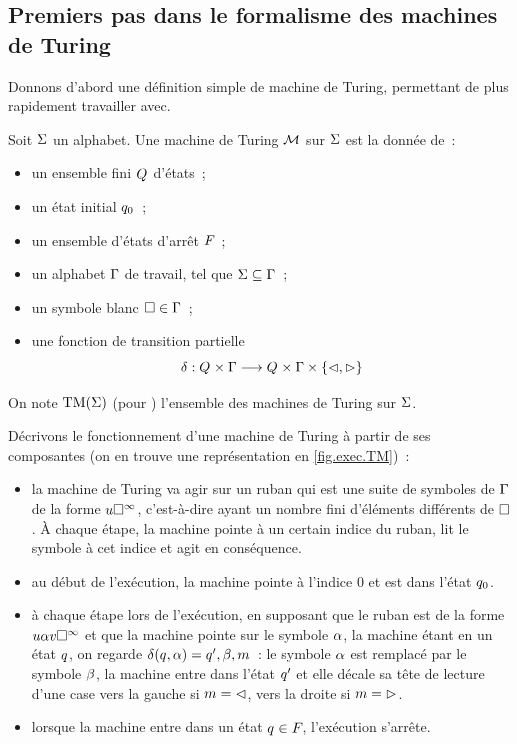 \subsection{Premiers pas dans le formalisme des machines de Turing}

Donnons d'abord une définition simple de machine de Turing, permettant de plus
rapidement travailler avec.

\begin{definition}
  Soit $\Sigma$ un alphabet. Une machine de Turing $\mathcal{M}$ sur $\Sigma$ est la
  donnée de~:
  \begin{itemize}
  \item un ensemble fini $Q_{}$ d'états~;
  \item un état initial $q_{0}$~;
  \item un ensemble d'états d'arrêt $F_{}$~;
  \item un alphabet $\Gamma$ de travail, tel que $\Sigma \subseteq \Gamma$~;
  \item un symbole blanc $\square \in \Gamma$~;
  \item une fonction de transition partielle
    \[\delta_{} : \displaystyle Q_{}\times\Gamma \longrightarrow Q_{}\times\Gamma\times\{\lhd,\rhd\}\]
  \end{itemize}

  On note $\TM(\ABA)$ (pour ) l'ensemble des
  machines de Turing sur $\Sigma$.
  \index[notation]{$\TM(\ABA)$}
\end{definition}

Décrivons le fonctionnement d'une machine de Turing à partir de ses
composantes (on en trouve une représentation en \cref{fig.exec.TM})~:
\begin{itemize}
\item la machine de Turing va agir sur un ruban qui est une suite de symboles de
  $\Gamma$ de la forme $u\square^{\infty}$, c'est-à-dire ayant un nombre fini
  d'éléments différents de $\square$. \`A chaque étape, la machine pointe à un
  certain indice du ruban, lit le symbole à cet indice et agit en conséquence.
\item au début de l'exécution, la machine pointe à l'indice $0$ et est dans
  l'état $q_{0}$.
\item à chaque étape lors de l'exécution, en supposant que le ruban est de la
  forme $u\alpha v\square^{\infty}$ et que la machine pointe sur le symbole
  $\alpha$, la machine étant en un état $q_{}$, on regarde
  $\delta_{}(q_{},\alpha) = q_{}',\beta,m$~: le symbole $\alpha$ est remplacé par
  le symbole $\beta$, la machine entre dans l'état $q_{}'$ et elle décale sa
  tête de lecture d'une case vers la gauche si $m = \lhd$, vers la droite si
  $m = \rhd$.
\item lorsque la machine entre dans un état $q_{} \in F_{}$, l'exécution
  s'arrête.
\end{itemize}

